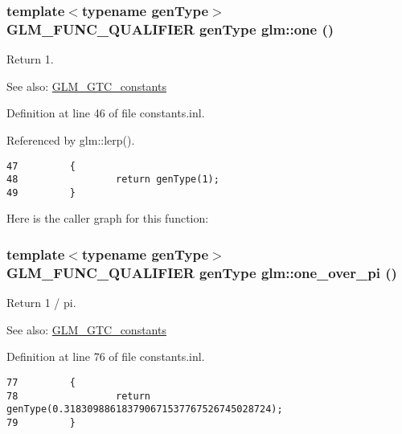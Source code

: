 \hypertarget{group__gtc__constants_gbc71dfc97639e8010a39c1892e68ed9b}{
\subsubsection[one]{\setlength{\rightskip}{0pt plus 5cm}template$<$typename genType$>$ GLM\_\-FUNC\_\-QUALIFIER genType glm::one ()}}
\label{group__gtc__constants_gbc71dfc97639e8010a39c1892e68ed9b}


Return 1. \begin{Desc}
\item[See also:]\hyperlink{group__gtc__constants}{GLM\_\-GTC\_\-constants} \end{Desc}


Definition at line 46 of file constants.inl.

Referenced by glm::lerp().

\begin{Code}\begin{verbatim}47         {
48                 return genType(1);
49         }
\end{verbatim}
\end{Code}




Here is the caller graph for this function:\hypertarget{group__gtc__constants_gcbd54875746accf5c4c5a52582c8d764}{
\subsubsection[one\_\-over\_\-pi]{\setlength{\rightskip}{0pt plus 5cm}template$<$typename genType$>$ GLM\_\-FUNC\_\-QUALIFIER genType glm::one\_\-over\_\-pi ()}}
\label{group__gtc__constants_gcbd54875746accf5c4c5a52582c8d764}


Return 1 / pi. \begin{Desc}
\item[See also:]\hyperlink{group__gtc__constants}{GLM\_\-GTC\_\-constants} \end{Desc}


Definition at line 76 of file constants.inl.

\begin{Code}\begin{verbatim}77         {
78                 return genType(0.318309886183790671537767526745028724);
79         }
\end{verbatim}
\end{Code}


